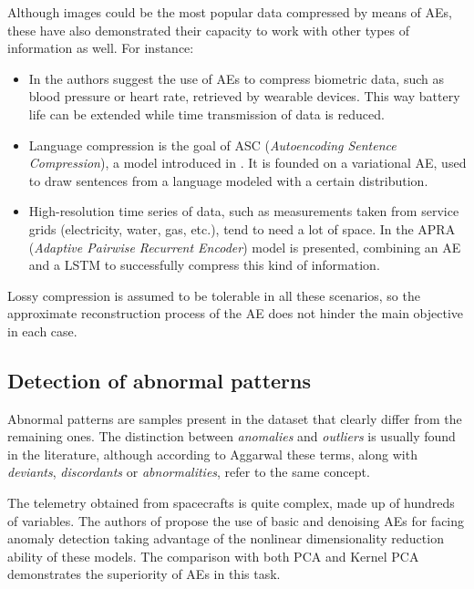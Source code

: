 Although images could be the most popular data compressed by means of AEs, these have also demonstrated their capacity to work with other types of information as well. For instance:
\begin{itemize}
    \item In  \cite{AEBioCompress} the authors suggest the use of AEs to compress biometric data, such as blood pressure or heart rate, retrieved by wearable devices. This way  battery life can be extended while time transmission of data is reduced. 
    
    \item Language compression is the goal of ASC (\textit{Autoencoding Sentence Compression}), a model introduced in \cite{VAESentenceCompress}. It is founded on a variational AE, used to draw sentences from a language modeled with a certain distribution.
    
    \item High-resolution time series of data, such as measurements taken from service grids (electricity, water, gas, etc.), tend to need a lot of space. In \cite{RAETSCompress} the APRA (\textit{Adaptive Pairwise Recurrent Encoder}) model is presented, combining an AE and a LSTM to successfully compress this kind of information.
\end{itemize}

Lossy compression is assumed to be tolerable in all these scenarios, so the approximate reconstruction process of the AE does not hinder the main objective in each case.

\subsection{Detection of abnormal patterns}
Abnormal patterns are samples present in the dataset that clearly differ from the remaining ones. The distinction between \textit{anomalies} and \textit{outliers} is usually found in the literature, although according to Aggarwal \cite{OutlierAnalysis} these terms, along with \textit{deviants}, \textit{discordants} or \textit{abnormalities}, refer to the same concept.

The telemetry obtained from spacecrafts is quite complex, made up of hundreds of variables. The authors of \cite{sakurada_anomaly_2014} propose the use of basic and denoising AEs for facing anomaly detection taking advantage of the nonlinear dimensionality reduction ability of these models. The comparison with both PCA and Kernel PCA demonstrates the superiority of AEs in this task.

